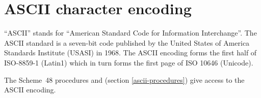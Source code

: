 
\appendix
\chapter{ASCII character encoding}
\label{ascii-chart}


``ASCII'' stands for ``American Standard Code for Information Interchange''.
The ASCII standard is a seven-bit code published by the United States of
 America Standards Institute (USASI) in 1968.
The ASCII encoding forms the first half of ISO-8859-1 (Latin1) which in
 turn forms the first page of ISO 10646 (Unicode).

The Scheme~48 procedures
 and
 (section \ref{ascii-procedures})
give access to the ASCII encoding.


